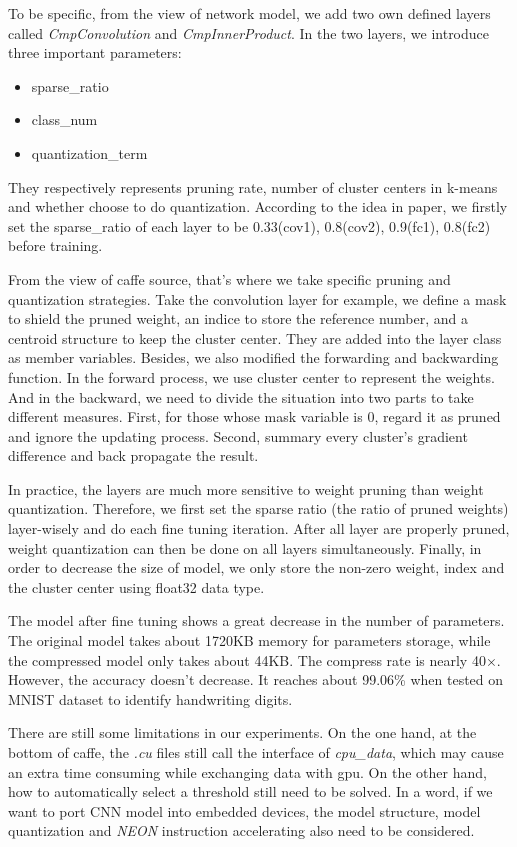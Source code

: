 \documentclass[a4paper]{article}
\begin{document}
\par To be specific, from the view of network model, we add two own defined layers called \textit{CmpConvolution} and \textit{CmpInnerProduct}. In the two layers, we introduce three important parameters:
\begin{itemize}
\item sparse\_ratio
\item class\_num
\item quantization\_term
\end{itemize}
\par They respectively represents pruning rate, number of cluster centers in k-means and whether choose to do quantization. According to the idea in paper, we firstly set the sparse\_ratio of each layer to be 0.33(cov1), 0.8(cov2), 0.9(fc1), 0.8(fc2) before training.
\par From the view of caffe source, that's where we take specific pruning and quantization strategies. Take the convolution layer for example, we define a mask to shield the pruned weight, an indice to store the reference number, and a centroid structure to keep the cluster center. They are added into the layer class as member variables. Besides, we also modified the forwarding and backwarding function. In the forward process, we use cluster center to represent the weights. And in the backward, we need to divide the situation into two parts to take different measures. First, for those whose mask variable is 0, regard it as pruned and ignore the updating process. Second, summary every cluster's gradient difference and back propagate the result.
\par In practice, the layers are much more sensitive to weight pruning than weight quantization. Therefore, we first set the sparse ratio (the ratio of pruned weights) layer-wisely and do each fine tuning iteration. After all layer are properly pruned, weight quantization can then be done on all layers simultaneously. Finally, in order to decrease the size of model, we only store the non-zero weight, index and the cluster center using float32 data type.

\par The model after fine tuning shows a great decrease in the number of parameters. The original model takes about 1720KB memory for parameters storage, while the compressed model only takes about 44KB. The compress rate is nearly 40×. However, the accuracy doesn't decrease. It reaches about 99.06\% when tested on MNIST dataset to identify handwriting digits.
\par There are still some limitations in our experiments. On the one hand, at the bottom of caffe, the \textit{.cu} files still call the interface of \textit{cpu\_data}, which may cause an extra time consuming while exchanging data with gpu. On the other hand, how to automatically select a threshold still need to be solved. In a word, if we want to port CNN model into embedded devices, the model structure, model quantization and \textit{NEON} instruction accelerating also need to be considered.
\end{document}
